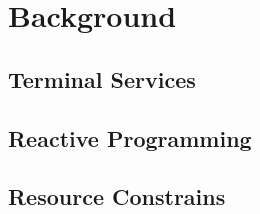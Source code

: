 \chapter{Background}
\label{sec:back}



\section{Terminal Services}


\section{Reactive Programming}


\section{Resource Constrains}